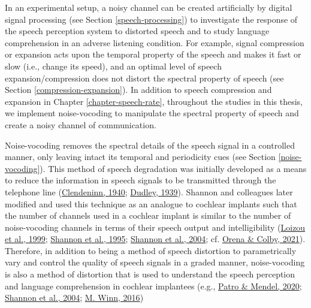 \documentclass[a4paper, nobind]{templates/ociamthesis}
\begin{document}
In an experimental setup, a noisy channel can be created artificially by digital signal processing (see Section \ref{speech-processing}) to investigate the response of the speech perception system to distorted speech
and to study language comprehension in an adverse listening condition.
For example, signal compression or expansion acts upon the temporal property of the speech and makes it fast or slow (i.e., change its speed), and an optimal level of speech expansion/compression does not distort the spectral property of speech (see Section \ref{compression-expansion}).
In addition to speech compression and expansion in Chapter \ref{chapter-speech-rate},
throughout the studies in this thesis, we implement noise-vocoding to manipulate the spectral property of speech and create a noisy channel of communication.

Noise-vocoding removes the spectral details of the speech signal in a controlled manner, only leaving intact its temporal and periodicity cues (see Section \ref{noise-vocoding}).
This method of speech degradation was initially developed as a means to reduce the information in speech signals to be transmitted through the telephone line (\protect\hyperlink{ref-Vocoder1940}{Clendeninn, 1940}; \protect\hyperlink{ref-Dudley1939}{Dudley, 1939}).
Shannon and colleagues later modified and used this technique as an analogue to cochlear implants such that the number of channels used in a cochlear implant is similar to the number of noise-vocoding channels in terms of their speech output and intelligibility (\protect\hyperlink{ref-Loizou1999}{Loizou et al., 1999}; \protect\hyperlink{ref-Shannon1995}{Shannon et al., 1995}; \protect\hyperlink{ref-Shannon2004}{Shannon et al., 2004}; cf. \protect\hyperlink{ref-Orena2021}{Orena \& Colby, 2021}).
Therefore, in addition to being a method of speech distortion to parametrically vary and control the quality of speech signals in a graded manner,
noise-vocoding is also a method of distortion that is used to understand the speech perception and language comprehension in cochlear implantees (e.g., \protect\hyperlink{ref-Patro2020}{Patro \& Mendel, 2020}; \protect\hyperlink{ref-Shannon2004}{Shannon et al., 2004}; \protect\hyperlink{ref-Winn2016}{M. Winn, 2016})
\end{document}
